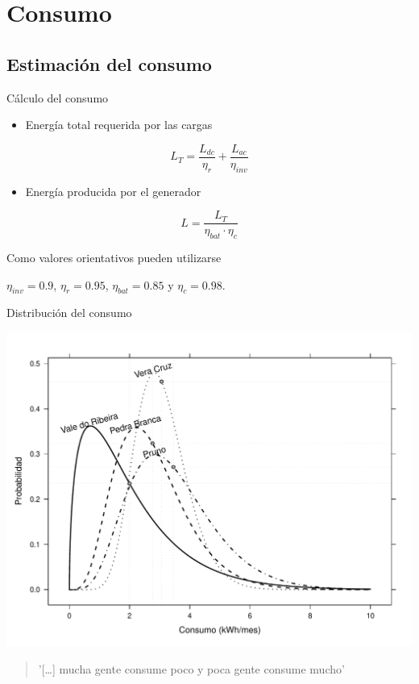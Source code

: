 \documentclass[xcolor={usenames,svgnames,dvipsnames}]{beamer}
\begin{document}
\section{Consumo}
\label{sec:orge584165}

\subsection{Estimación del consumo}
\label{sec:org14faebf}
\begin{frame}[label={sec:orgb770eec}]{Cálculo del consumo}
\begin{itemize}
\item Energía total requerida por las cargas
\end{itemize}
$$L_{T}=\frac{L_{dc}}{\eta_{r}}+\frac{L_{ac}}{\eta_{inv}}$$

\begin{itemize}
\item Energía producida por el generador
\end{itemize}
$$L=\frac{L_{T}}{\eta_{bat}\cdot\eta_{c}}$$

Como valores orientativos pueden utilizarse

\(\eta_{inv}=0.9\), \(\eta_{r}=0.95\), \(\eta_{bat}=0.85\) y \(\eta_{c}=0.98\).
\end{frame}

\begin{frame}[label={sec:org176a95a}]{Distribución del consumo}
\begin{center}
\includegraphics[width=.9\linewidth]{../figs/ConsumoGamma.pdf}
\end{center}

\begin{quote}
'[\ldots{}] mucha gente consume poco y poca gente consume mucho'
\end{quote}
\end{frame}
\end{document}
